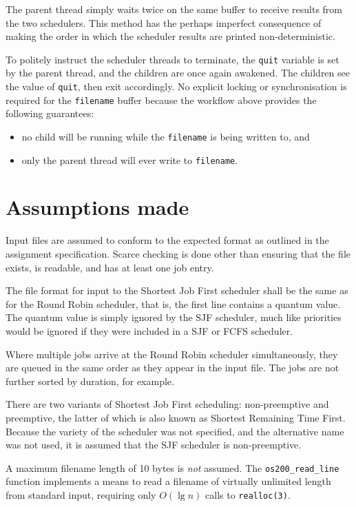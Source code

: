 \documentclass[a4paper,12pt,titlepage]{article}
\begin{document}
The parent thread simply waits twice on the same buffer to receive results from
the two schedulers. This method has the perhaps imperfect consequence of making
the order in which the scheduler results are printed non-deterministic.

To politely instruct the scheduler threads to terminate, the \texttt{quit}
variable is set by the parent thread, and the children are once again awakened.
The children see the value of \texttt{quit}, then exit accordingly. No explicit
locking or synchronisation is required for the \texttt{filename} buffer because
the workflow above provides the following guarantees:

\begin{itemize}
	\item no child will be running while the \texttt{filename} is being
	      written to, and
	\item only the parent thread will ever write to \texttt{filename}.
\end{itemize}

\newpage

\section{Assumptions made}

Input files are assumed to conform to the expected format as outlined in the
assignment specification. Scarce checking is done other than ensuring that the
file exists, is readable, and has at least one job entry.

The file format for input to the Shortest Job First scheduler shall be the same
as for the Round Robin scheduler, that is, the first line contains a quantum
value. The quantum value is simply ignored by the SJF scheduler, much like
priorities would be ignored if they were included in a SJF or FCFS scheduler.

Where multiple jobs arrive at the Round Robin scheduler simultaneously, they
are queued in the same order as they appear in the input file. The jobs are not
further sorted by duration, for example.

There are two variants of Shortest Job First scheduling: non-preemptive and
preemptive, the latter of which is also known as Shortest Remaining Time First.
Because the variety of the scheduler was not specified, and the alternative
name was not used, it is assumed that the SJF scheduler is non-preemptive.

A maximum filename length of 10 bytes is \textit{not} assumed. The
\texttt{os200\_read\_line} function implements a means to read a filename of
virtually unlimited length from standard input, requiring only $O(\lg n)$ calls
to \texttt{realloc(3)}.
\end{document}
